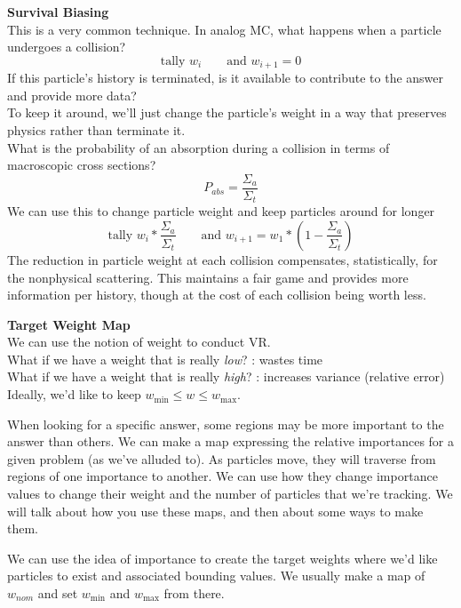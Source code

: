 \documentclass[12pt]{article}
\begin{document}
\textbf{Survival Biasing}\\
This is a very common technique. In analog MC, what happens when a particle undergoes a collision?
\[
\text{tally }w_i \qquad \text{and } w_{i+1} = 0
\]
If this particle's history is terminated, is it available to contribute to the answer and provide more data?\\
To keep it around, we'll just change the particle's weight in a way that preserves physics rather than terminate it. \\
What is the probability of an absorption during a collision in terms of macroscopic cross sections?
\[
P_{abs} = \frac{\Sigma_a}{\Sigma_t}
\]
We can use this to change particle weight and keep particles around for longer
\[
\text{tally }w_i*\frac{\Sigma_a}{\Sigma_t} \qquad \text{and } w_{i+1} = w_1*(1 - \frac{\Sigma_a}{\Sigma_t})
\]
The reduction in particle weight at each collision compensates, statistically, for the nonphysical scattering. This maintains a fair game and provides more information per history, though at the cost of each collision being worth less.

\textbf{Target Weight Map}\\
We can use the notion of weight to conduct VR. \\
What if we have a weight that is really \textit{low}? : wastes time\\
What if we have a weight that is really \textit{high}? : increases variance (relative error)\\
Ideally, we'd like to keep $w_{\min} \leq w \leq w_{\max}$.

When looking for a specific answer, some regions may be more important to the answer than others. We can make a map expressing the relative importances for a given problem (as we've alluded to). As particles move, they will traverse from regions of one importance to another. We can use how they change importance values to change their weight and the number of particles that we're tracking. We will talk about how you use these maps, and then about some ways to make them.

We can use the idea of importance to create the target weights where we'd like particles to exist and associated bounding values. We usually make a map of $w_{nom}$ and set $w_{\min}$ and $w_{\max}$ from there. 
\end{document}
